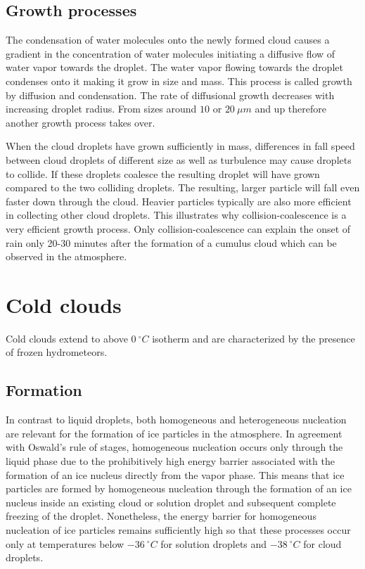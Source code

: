\subsection{Growth processes}

The condensation of water molecules onto the newly formed cloud causes a
gradient in the concentration of water molecules initiating  a diffusive flow
of water vapor towards the droplet. The water vapor flowing towards the droplet
condenses onto it making it grow in size and mass. This process is called
growth by diffusion and condensation. The rate of diffusional growth decreases
with increasing droplet radius. From sizes around $10$ or $20\ \unit{\mu m}$ and
up therefore another growth process takes over.

When the cloud droplets have grown sufficiently in mass, differences in fall
speed between cloud droplets of different size as well as turbulence may cause
droplets to collide. If these droplets coalesce the resulting droplet will have
grown compared to the two colliding droplets. The resulting, larger particle
will fall even faster down through the cloud. Heavier particles typically are
also more efficient in collecting other cloud droplets. This illustrates why
collision-coalescence is a very efficient growth process. Only
collision-coalescence can explain the onset of rain only 20-30 minutes after the
formation of a cumulus cloud which can be observed in the atmosphere.

\section{Cold clouds}

Cold clouds extend to above $0\ \unit{^\circ C}$ isotherm and are characterized
by the presence of frozen hydrometeors.


\subsection{Formation}

In contrast to liquid droplets, both homogeneous and heterogeneous nucleation
are relevant for the formation of ice particles in the atmosphere. In agreement
with Oswald's rule of stages, homogeneous nucleation occurs only through the liquid
phase due to the prohibitively high energy barrier associated with the formation
of an ice nucleus directly from the vapor phase. This means that ice particles
are formed by homogeneous nucleation through the formation of an ice nucleus
inside an existing cloud or solution droplet and subsequent complete freezing of
the droplet. Nonetheless, the energy barrier for homogeneous nucleation of ice
particles remains sufficiently high so that these processes occur only at
temperatures below $-36\ \unit{^\circ C}$ for solution droplets and
$-38\ \unit{^\circ C}$ for cloud droplets.

